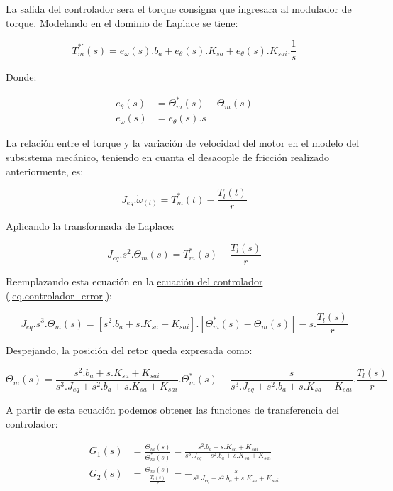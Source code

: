 \documentclass{article}
\begin{document}
La salida del controlador sera el torque consigna que ingresara al modulador de torque. Modelando en el 
dominio de Laplace se tiene:

\begin{equation}\label{eq.controlador_error}
    T_m^{*\prime}(s) = e_\omega(s).b_a + e_\theta(s).K_{sa} + e_\theta(s).K_{sai}.\frac{1}{s}
\end{equation}

Donde:

\begin{align*}
    e_\theta(s) &= \Theta_m^*(s) - \Theta_m(s) \\
    e_\omega(s) &= e_\theta(s).s
\end{align*}

La relación entre el torque y la variación de velocidad del motor en el modelo del subsistema mecánico, 
teniendo en cuanta el desacople de fricción realizado anteriormente, es:

\begin{equation}
    J_{eq}.\dot{\omega}_(t) = T_m^*(t) - \frac{T_l(t)}{r}
\end{equation}

Aplicando la transformada de Laplace:

\begin{equation}
    J_{eq}.s^2.\Theta_m(s) = T_m^*(s) - \frac{T_l(s)}{r}
\end{equation}

Reemplazando esta ecuación en la
\hyperref[eq.controlador_error]{ecuación del controlador (\ref*{eq.controlador_error})}:

\begin{equation}
    J_{eq}.s^3.\Theta_m(s) = [s^2.b_a + s.K_{sa} + K_{sai}].[\Theta_m^*(s) - \Theta_m(s)] - s.\frac{T_l(s)}{r}
\end{equation}

Despejando, la posición del retor queda expresada como:

\begin{equation}
    \Theta_m(s) = \frac{s^2.b_a + s.K_{sa} + K_{sai}}{s^3.J_{eq} + s^2.b_a + s.K_{sa} + K_{sai}}.\Theta_m^*(s) - \frac{s}{s^3.J_{eq} + s^2.b_a + s.K_{sa} + K_{sai}}.\frac{T_l(s)}{r}
\end{equation}

A partir de esta ecuación podemos obtener las funciones de transferencia del controlador:

\begin{align}
    G_1(s) &= \frac{\Theta_m(s)}{\Theta_m^*(s)} = \frac{s^2.b_a + s.K_{sa} + K_{sai}}{s^3.J_{eq} + s^2.b_a + s.K_{sa} + K_{sai}} \\
    G_2(s) &= \frac{\Theta_m(s)}{\frac{T_l(s)}{r}} = -\frac{s}{s^3.J_{eq} + s^2.b_a + s.K_{sa} + K_{sai}}
\end{align}
\end{document}
